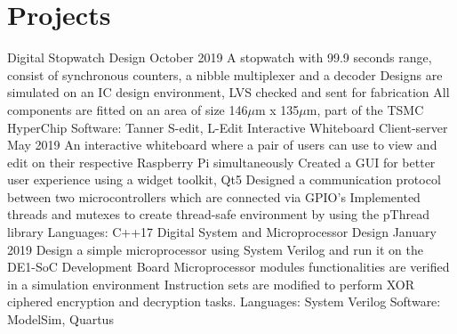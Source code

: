 \documentclass{myresume}
\begin{document}
\section{Projects~\hrulefill}
%
\cvEntryTwo
{Digital Stopwatch Design}
{October 2019}
{A stopwatch with 99.9 seconds range, consist of synchronous counters, a nibble multiplexer and a decoder\newline\vspace{1ex}
\tabitem Designs are simulated on an IC design environment, LVS checked and sent for fabrication\newline
\tabitem All components are fitted on an area of size 146$\mu$m x 135$\mu$m, part of the TSMC HyperChip\newline
\vspace{.5ex}Software: Tanner S-edit, L-Edit\newline}
%
\cvEntryTwo
{Interactive Whiteboard Client-server}
{May 2019}
{An interactive whiteboard where a pair of users can use to view and edit on their respective Raspberry Pi simultaneously\newline\vspace{1ex}
\tabitem Created a GUI for better user experience using a widget toolkit, Qt5\newline
\tabitem Designed a communication protocol between two microcontrollers which are connected via GPIO's\newline
\tabitem Implemented threads and mutexes to create thread-safe environment by using the pThread library\newline
\vspace{.5ex}Languages: C++17\newline}
%
\cvEntryTwo
{Digital System and Microprocessor Design}
{January 2019}
{Design a simple microprocessor using System Verilog and run it on the DE1-SoC Development Board\newline\vspace{1ex}
\tabitem Microprocessor modules functionalities are verified in a simulation environment\newline
\tabitem Instruction sets are modified to perform XOR ciphered encryption and decryption tasks.\newline
\vspace{.5ex}Languages: System Verilog\newline
Software: ModelSim, Quartus}
%
%
\end{document}
